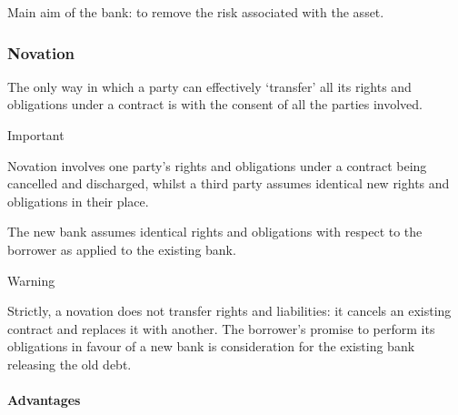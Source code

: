 \documentclass[
]{article}
\newenvironment{env-9a8b2d5a-e80b-4017-bd60-2afb8ee62329}
{
    \savenotes\tcolorbox[blanker,breakable,left=5pt,borderline west={2pt}{-4pt}{orange}]
}
{
    \endtcolorbox\spewnotes
}
\newenvironment{env-02a65e52-3e2f-4e42-a1ad-a9c88e6d3852}
{
    \savenotes\tcolorbox[blanker,breakable,left=5pt,borderline west={2pt}{-4pt}{cyan}]
}
{
    \endtcolorbox\spewnotes
}
\begin{document}
Main aim of the bank: to remove the risk associated with the asset.

\hypertarget{novation}{%
\subsubsection{Novation}\label{novation}}

The only way in which a party can effectively `transfer' all its rights
and obligations under a contract is with the consent of all the parties
involved.

\begin{env-02a65e52-3e2f-4e42-a1ad-a9c88e6d3852}

Important

Novation involves one party's rights and obligations under a contract
being cancelled and discharged, whilst a third party assumes identical
new rights and obligations in their place.

\end{env-02a65e52-3e2f-4e42-a1ad-a9c88e6d3852}

The new bank assumes identical rights and obligations with respect to
the borrower as applied to the existing bank.

\begin{env-9a8b2d5a-e80b-4017-bd60-2afb8ee62329}

Warning

Strictly, a novation does not transfer rights and liabilities: it
cancels an existing contract and replaces it with another. The
borrower's promise to perform its obligations in favour of a new bank is
consideration for the existing bank releasing the old debt.

\end{env-9a8b2d5a-e80b-4017-bd60-2afb8ee62329}

\hypertarget{advantages}{%
\paragraph{Advantages}\label{advantages}}
\end{document}
